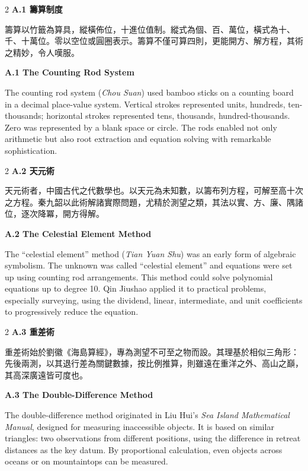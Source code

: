 \documentclass[11pt,a4paper]{article}
\begin{document}
\begin{paracol}{2}
\switchcolumn[0]
\noindent\textbf{\color{sectioncolor}A.1 籌算制度}

籌算以竹籤為算具，縱橫佈位，十進位值制。縱式為個、百、萬位，橫式為十、千、十萬位。零以空位或圓圈表示。籌算不僅可算四則，更能開方、解方程，其術之精妙，令人嘆服。

\switchcolumn[1]
\noindent\textbf{\color{sectioncolor}A.1 The Counting Rod System}

The counting rod system (\textit{Chou Suan}) used bamboo sticks on a counting board in a decimal place-value system. Vertical strokes represented units, hundreds, ten-thousands; horizontal strokes represented tens, thousands, hundred-thousands. Zero was represented by a blank space or circle. The rods enabled not only arithmetic but also root extraction and equation solving with remarkable sophistication.
\end{paracol}

\vspace{0.5em}

\begin{paracol}{2}
\switchcolumn[0]
\noindent\textbf{\color{sectioncolor}A.2 天元術}

天元術者，中國古代之代數學也。以天元為未知數，以籌布列方程，可解至高十次之方程。秦九韶以此術解諸實際問題，尤精於測望之類，其法以實、方、廉、隅諸位，逐次降冪，開方得解。

\switchcolumn[1]
\noindent\textbf{\color{sectioncolor}A.2 The Celestial Element Method}

The ``celestial element'' method (\textit{Tian Yuan Shu}) was an early form of algebraic symbolism. The unknown was called ``celestial element'' and equations were set up using counting rod arrangements. This method could solve polynomial equations up to degree 10. Qin Jiushao applied it to practical problems, especially surveying, using the dividend, linear, intermediate, and unit coefficients to progressively reduce the equation.
\end{paracol}

\vspace{0.5em}

\begin{paracol}{2}
\switchcolumn[0]
\noindent\textbf{\color{sectioncolor}A.3 重差術}

重差術始於劉徽《海島算經》，專為測望不可至之物而設。其理基於相似三角形：先後兩測，以其退行差為關鍵數據，按比例推算，則雖遠在重洋之外、高山之巔，其高深廣遠皆可度也。

\switchcolumn[1]
\noindent\textbf{\color{sectioncolor}A.3 The Double-Difference Method}

The double-difference method originated in Liu Hui's \textit{Sea Island Mathematical Manual}, designed for measuring inaccessible objects. It is based on similar triangles: two observations from different positions, using the difference in retreat distances as the key datum. By proportional calculation, even objects across oceans or on mountaintops can be measured.
\end{paracol}
\end{document}
